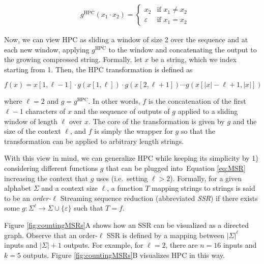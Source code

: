 \documentclass[
  11pt,
  twoside]{scrbook}
\begin{document}
\begin{align*}
    & g^\text{HPC}(x_1\cdot x_2) =
    \begin{cases}
        x_2 & \text{if } x_1 \neq x_2 \\
        \varepsilon & \text{if } x_1 = x_2
    \end{cases}
\end{align*}

Now, we can view HPC as sliding a window of size 2 over the sequence and at each
new window, applying \(g^\text{HPC}\) to the window and concatenating the output
to the growing compressed string. Formally, let \(x\) be a string, which we index
starting from 1. Then, the HPC transformation is defined as

\begin{equation}
  f(x) = x[1,\ell-1]\cdot g(x[1,\ell]) \cdot g(x[2, \ell+1])\cdots g(x[|x|-\ell+1,|x|]) 
  \label{eq:MSR}
\end{equation}

where \(\ell = 2\) and \(g=g^\text{HPC}\). In other words, \(f\) is the concatenation
of the first \(\ell-1\) characters of \(x\) and the sequence of outputs of \(g\)
applied to a sliding window of length \(\ell\) over \(x\). The core of the
transformation is given by \(g\) and the size of the context \(\ell\), and \(f\) is
simply the wrapper for \(g\) so that the transformation can be applied to
arbitrary length strings.

With this view in mind, we can generalize HPC while keeping its simplicity by 1)
considering different functions \(g\) that can be plugged into~Equation
\eqref{eq:MSR} increasing the context that \(g\) uses (i.e.~setting \(\ell>2\)).
Formally, for a given alphabet \(\Sigma\) and a context size \(\ell\), a function
\(T\) mapping strings to strings is said to be an \emph{order-}\(\ell\) Streaming
sequence reduction (abbreviated \emph{SSR}) if there exists some
\(g : \Sigma^\ell\rightarrow\Sigma\cup\{\varepsilon\}\) such that \(T=f\).

Figure \ref{fig:countingMSRs}A shows how an SSR can be visualized as a directed
graph. Observe that an order-\(\ell\) SSR is defined by a mapping between
\(|\Sigma|^\ell\) inputs and \(|\Sigma| + 1\) outputs. For example, for \(\ell=2\),
there are \(n=16\) inputs and \(k=5\) outputs. Figure \ref{fig:countingMSRs}B
visualizes HPC in this way.
\end{document}
